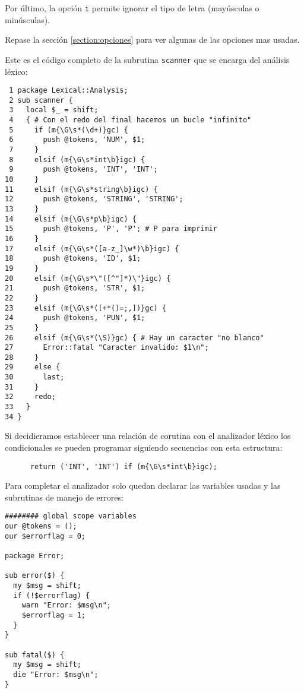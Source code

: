 Por último, la opción \verb|i| permite ignorar el tipo de letra (mayúsculas 
o minúsculas).

Repase la sección
\ref{section:opciones}
para ver algunas de las opciones mas usadas.


Este es el código completo de la subrutina \verb|scanner| que se encarga
del análisis léxico:

\begin{verbatim}
 1 package Lexical::Analysis;
 2 sub scanner {
 3   local $_ = shift;
 4   { # Con el redo del final hacemos un bucle "infinito"
 5     if (m{\G\s*(\d+)}gc) {
 6       push @tokens, 'NUM', $1;
 7     } 
 8     elsif (m{\G\s*int\b}igc) {
 9       push @tokens, 'INT', 'INT';
10     } 
11     elsif (m{\G\s*string\b}igc) {
12       push @tokens, 'STRING', 'STRING';
13     } 
14     elsif (m{\G\s*p\b}igc) {
15       push @tokens, 'P', 'P'; # P para imprimir
16     } 
17     elsif (m{\G\s*([a-z_]\w*)\b}igc) {
18       push @tokens, 'ID', $1;
19     } 
20     elsif (m{\G\s*\"([^"]*)\"}igc) {
21       push @tokens, 'STR', $1;
22     } 
23     elsif (m{\G\s*([+*()=;,])}gc) {
24       push @tokens, 'PUN', $1;
25     }
26     elsif (m{\G\s*(\S)}gc) { # Hay un caracter "no blanco"
27       Error::fatal "Caracter invalido: $1\n";
28     }
29     else {
30       last;
31     }
32     redo;
33   }
34 }
\end{verbatim}


Si decidieramos establecer una relación de corutina con el analizador léxico los 
condicionales se pueden programar siguiendo secuencias con esta estructura:

\begin{verbatim}
      return ('INT', 'INT') if (m{\G\s*int\b}igc);
\end{verbatim}
     

Para completar el analizador solo quedan declarar 
las variables usadas y las subrutinas de manejo de errores:

\begin{verbatim}
######## global scope variables
our @tokens = ();
our $errorflag = 0;

package Error;

sub error($) {
  my $msg = shift;
  if (!$errorflag) {
    warn "Error: $msg\n";
    $errorflag = 1;
  }
}

sub fatal($) {
  my $msg = shift;
  die "Error: $msg\n";
}
\end{verbatim}

